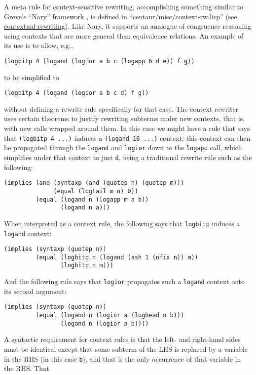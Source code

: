 A meta rule for context-sensitive rewriting, accomplishing something
similar to Greve's ``Nary'' framework \cite{greve06}, is defined in
``centaur/misc/context-rw.lisp'' (see
\href{http://www.cs.utexas.edu/users/moore/acl2/manuals/current/manual/index.html?topic=ACL2\_\_\_\_CONTEXTUAL-REWRITING}{\underline{contextual-rewriting}}).
Like Nary, it supports an analogue of congruence reasoning using
contexts that are more general than equivalence relations.  An example
of its use is to allow, e.g.,
\begin{verbatim}
(logbitp 4 (logand (logior a b c (logapp 6 d e)) f g))
\end{verbatim}
\noindent to be simplified to
\begin{verbatim}
(logbitp 4 (logand (logior a b c d) f g))
\end{verbatim}
without defining a rewrite rule specifically for that case. The
context rewriter uses certain theorems to justify rewriting subterms
under new contexts, that is, with new calls wrapped around them.  In
this case we might have a rule that says that \texttt{(logbitp 4 ...)}
induces a \texttt{(logand 16 ...)} context; this context can then be
propagated through the \texttt{logand} and \texttt{logior} down to the
\texttt{logapp} call, which simplifies under that context to just
\texttt{d}, using a traditional rewrite rule such as the following:
\begin{verbatim}
(implies (and (syntaxp (and (quotep n) (quotep m)))
              (equal (logtail m n) 0))
         (equal (logand n (logapp m a b))
                (logand n a)))
\end{verbatim}
\noindent When interpreted as a context rule, the following says that
\texttt{logbitp} induces a \texttt{logand} context:
\begin{verbatim}
(implies (syntaxp (quotep n))
         (equal (logbitp n (logand (ash 1 (nfix n)) m))
                (logbitp n m)))
\end{verbatim}
\noindent And the following rule says that \texttt{logior} propagates such a
\texttt{logand} context onto its second argument:
\begin{verbatim}
(implies (syntaxp (quotep n))
         (equal (logand n (logior a (loghead n b)))
                (logand n (logior a b))))
\end{verbatim}
\noindent A syntactic requirement for context rules is that the left-
and right-hand sides must be identical except that some subterm of the
LHS is replaced by a variable in the RHS (in this case \texttt{b}),
and that is the only occurrence of that variable in the RHS.  That

